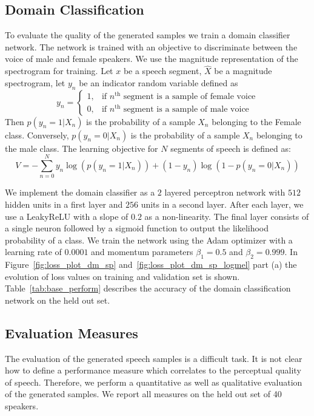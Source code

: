 \subsection{Domain Classification}
\label{subsec:dclf}
To evaluate the quality of the generated samples we train a domain classifier network. The network is trained with an objective to discriminate between the voice of male and female speakers. We use the magnitude representation of the spectrogram for training. Let $x$ be a speech segment, $\hat{X}$ be a magnitude spectrogram, let $y_n$ be an indicator random variable defined as
\[
y_n =
\begin{cases}
    1,& \text{if $n^\text{th}$ segment is a sample of female voice} \\
    0,& \text{if $n^\text{th}$ segment is a sample of male voice} 
\end{cases}
\]
Then $p(y_n=1|X_n)$ is the probability of a sample $X_n$ belonging to the Female class. Conversely, $p(y_n=0|X_n)$ is the probability of a sample $X_n$ belonging to the male class. The learning objective for $N$ segments of speech is defined as:
\begin{equation}
    V = - \sum_{n=0}^N y_n \log(p(y_n=1|X_n)) + (1-y_n) \log(1-p(y_n=0|X_n))
\end{equation}

We implement the domain classifier as a $2$ layered perceptron network with $512$ hidden units in a first layer and $256$ units in a second layer. After each layer, we use a LeakyReLU with a slope of $0.2$ as a non-linearity. The final layer consists of a single neuron followed  by a sigmoid function to output the likelihood probability of a class. We train the network using the Adam optimizer with a learning rate of $0.0001$ and momentum parameters $\beta_1=0.5$ and $\beta_2=0.999$. In Figure~\ref{fig:loss_plot_dm_sp} and~\ref{fig:loss_plot_dm_sp_logmel} part (a) the evolution of loss values on training and validation set is shown. Table~\ref{tab:base_perform} describes the accuracy of the domain classification network on the held out set.


\subsection{Evaluation Measures}
The evaluation of the generated speech samples is a difficult task. It is not clear how to define a performance measure which correlates to the perceptual quality of speech. Therefore, we perform a quantitative as well as qualitative evaluation of the generated samples. We report all measures on the held out set of 40 speakers.

